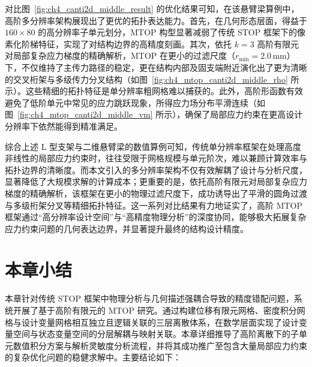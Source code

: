 对比图~\ref{fig:ch4_canti2d_middle_result} 的优化结果可知，在该悬臂梁算例中，高阶多分辨率架构展现出了更优的拓扑表达能力。首先，在几何形态层面，得益于 $160 \times 80$ 的高分辨率子单元划分，MTOP 构型显著减弱了传统 STOP 框架下的像素化阶梯特征，实现了对结构边界的高精度刻画。其次，依托 $k=3$ 高阶有限元对局部复杂应力梯度的精确解析，MTOP 在更小的过滤尺度（$r_{\min} = 2.0\,\mathrm{mm}$）下，不仅维持了主传力路径的稳定，更在结构内部及固支端附近演化出了更为清晰的交叉桁架与多级传力分叉结构（如图~\ref{fig:ch4_mtop_canti2d_middle_rho} 所示）。这些精细的拓扑特征是单分辨率粗网格难以捕获的。此外，高阶形函数有效避免了低阶单元中常见的应力跳跃现象，所得应力场分布平滑连续（如图~\ref{fig:ch4_mtop_canti2d_middle_vm} 所示），确保了局部应力约束在更高设计分辨率下依然能得到精准满足。

综合上述 L 型支架与二维悬臂梁的数值算例可知，传统单分辨率框架在处理高度非线性的局部应力约束时，往往受限于网格规模与单元阶次，难以兼顾计算效率与拓扑边界的清晰度。而本文引入的多分辨率架构不仅有效解耦了设计与分析尺度，显著降低了大规模求解的计算成本；更重要的是，依托高阶有限元对局部复杂应力梯度的精确解析，该框架在更小的物理过滤尺度下，成功诱导出了平滑的圆角过渡与多级桁架分叉等精细拓扑特征。这一系列对比结果有力地证实了，高阶 MTOP 框架通过“高分辨率设计空间”与“高精度物理分析”的深度协同，能够极大拓展复杂应力约束问题的几何表达边界，并显著提升最终的结构设计精度。


\section{本章小结}
\label{sec:ch4_summary}

本章针对传统 STOP 框架中物理分析与几何描述强耦合导致的精度错配问题，系统开展了基于高阶有限元的 MTOP 研究。通过构建位移有限元网格、密度积分网格与设计变量网格相互独立且逻辑关联的三层离散体系，在数学层面实现了设计变量空间与状态变量空间的分层解耦与映射关联。本章详细推导了高阶离散下的子单元数值积分方案与解析灵敏度分析流程，并将其成功推广至包含大量局部应力约束的复杂优化问题的稳健求解中。主要结论如下：

